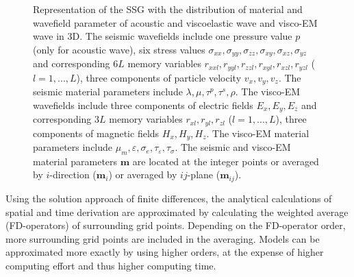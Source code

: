 \documentclass[pdftex,a4paper,parskip,listof=totoc,bibliography=totoc,onehalfspacing,12pt]{scrreprt}
\begin{document}
\begin{figure}
\caption[]{Representation of the SSG with the distribution of material and wavefield parameter of acoustic and viscoelastic wave \citep{graves1996simulating} and visco-EM wave \citep{yee1966numerical} in 3D. The seismic wavefields include one pressure value $p$ (only for acoustic wave), six stress values $\sigma_{xx}, \sigma_{yy}, \sigma_{zz}, \sigma_{xy}, \sigma_{xz}, \sigma_{yz}$ and corresponding $6L$ memory variables $r_{xxl}, r_{yyl}, r_{zzl}, r_{xyl}, r_{xzl}, r_{yzl}$ ($l=1,...,L$), three components of particle velocity $v_x, v_y, v_z$. The seismic material parameters include $\lambda, \mu, \tau^p, \tau^s, \rho$. The visco-EM wavefields include three components of electric fields $E_x, E_y, E_z$ and corresponding $3L$ memory variables $r_{xl}, r_{yl}, r_{zl}$ ($l=1,...,L$), three components of magnetic fields $H_x, H_y, H_z$. The visco-EM material parameters include $\mu_m, \varepsilon, \sigma_e, \tau_{\varepsilon}, \tau_{\sigma}$. The seismic and visco-EM material parameters $\mathbf{m}$ are located at the integer points or averaged by $i$-direction ($\mathbf{m}_i$) or averaged by $ij$-plane ($\mathbf{m}_{ij}$).}
\label{fig:StagGrid3D}
\end{figure}

Using the solution approach of finite differences, the analytical calculations of spatial and time derivation are approximated by calculating the weighted average (FD-operators) of surrounding grid points. Depending on the FD-operator order, more surrounding grid points are included in the averaging. Models can be approximated more exactly by using higher orders, at the expense of higher computing effort and thus higher computing time.
\end{document}
